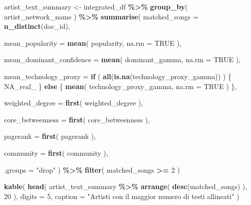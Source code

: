 \documentclass[
]{article}
\newenvironment{Shaded}{\begin{snugshade}}{\end{snugshade}}
\newcommand{\AttributeTok}[1]{\textcolor[rgb]{0.13,0.29,0.53}{#1}}
\newcommand{\ConstantTok}[1]{\textcolor[rgb]{0.56,0.35,0.01}{#1}}
\newcommand{\ControlFlowTok}[1]{\textcolor[rgb]{0.13,0.29,0.53}{\textbf{#1}}}
\newcommand{\DecValTok}[1]{\textcolor[rgb]{0.00,0.00,0.81}{#1}}
\newcommand{\FunctionTok}[1]{\textcolor[rgb]{0.13,0.29,0.53}{\textbf{#1}}}
\newcommand{\NormalTok}[1]{#1}
\newcommand{\OtherTok}[1]{\textcolor[rgb]{0.56,0.35,0.01}{#1}}
\newcommand{\SpecialCharTok}[1]{\textcolor[rgb]{0.81,0.36,0.00}{\textbf{#1}}}
\newcommand{\StringTok}[1]{\textcolor[rgb]{0.31,0.60,0.02}{#1}}
\begin{document}
\begin{Shaded}
\begin{Highlighting}[]
\NormalTok{artist\_text\_summary }\OtherTok{\textless{}{-}}\NormalTok{ integrated\_df }\SpecialCharTok{\%\textgreater{}\%}
  \FunctionTok{group\_by}\NormalTok{(}
\NormalTok{    artist\_network\_name}
\NormalTok{  ) }\SpecialCharTok{\%\textgreater{}\%}
  \FunctionTok{summarise}\NormalTok{(}
    \AttributeTok{matched\_songs =} \FunctionTok{n\_distinct}\NormalTok{(doc\_id),}

    \AttributeTok{mean\_popularity =} \FunctionTok{mean}\NormalTok{(}
\NormalTok{      popularity,}
      \AttributeTok{na.rm =} \ConstantTok{TRUE}
\NormalTok{    ),}

    \AttributeTok{mean\_dominant\_confidence =} \FunctionTok{mean}\NormalTok{(}
\NormalTok{      dominant\_gamma,}
      \AttributeTok{na.rm =} \ConstantTok{TRUE}
\NormalTok{    ),}

    \AttributeTok{mean\_technology\_proxy =} \ControlFlowTok{if}\NormalTok{ (}
      \FunctionTok{all}\NormalTok{(}\FunctionTok{is.na}\NormalTok{(technology\_proxy\_gamma))}
\NormalTok{    ) \{}
      \ConstantTok{NA\_real\_}
\NormalTok{    \} }\ControlFlowTok{else}\NormalTok{ \{}
      \FunctionTok{mean}\NormalTok{(}
\NormalTok{        technology\_proxy\_gamma,}
        \AttributeTok{na.rm =} \ConstantTok{TRUE}
\NormalTok{      )}
\NormalTok{    \},}

    \AttributeTok{weighted\_degree =} \FunctionTok{first}\NormalTok{(}
\NormalTok{      weighted\_degree}
\NormalTok{    ),}

    \AttributeTok{core\_betweenness =} \FunctionTok{first}\NormalTok{(}
\NormalTok{      core\_betweenness}
\NormalTok{    ),}

    \AttributeTok{pagerank =} \FunctionTok{first}\NormalTok{(}
\NormalTok{      pagerank}
\NormalTok{    ),}

    \AttributeTok{community =} \FunctionTok{first}\NormalTok{(}
\NormalTok{      community}
\NormalTok{    ),}

    \AttributeTok{.groups =} \StringTok{"drop"}
\NormalTok{  ) }\SpecialCharTok{\%\textgreater{}\%}
  \FunctionTok{filter}\NormalTok{(}
\NormalTok{    matched\_songs }\SpecialCharTok{\textgreater{}=} \DecValTok{2}
\NormalTok{  )}

\FunctionTok{kable}\NormalTok{(}
  \FunctionTok{head}\NormalTok{(}
\NormalTok{    artist\_text\_summary }\SpecialCharTok{\%\textgreater{}\%}
      \FunctionTok{arrange}\NormalTok{(}
        \FunctionTok{desc}\NormalTok{(matched\_songs)}
\NormalTok{      ),}
    \DecValTok{20}
\NormalTok{  ),}
  \AttributeTok{digits =} \DecValTok{5}\NormalTok{,}
  \AttributeTok{caption =} \StringTok{"Artisti con il maggior numero di testi allineati"}
\NormalTok{)}
\end{Highlighting}
\end{Shaded}
\end{document}
